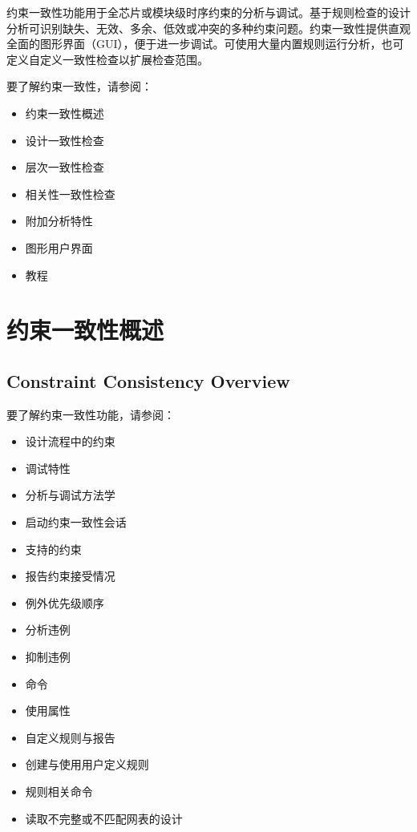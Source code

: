 \label{chap:cc}

约束一致性功能用于全芯片或模块级时序约束的分析与调试。基于规则检查的设计分析可识别缺失、无效、多余、低效或冲突的多种约束问题。约束一致性提供直观全面的图形界面（GUI），便于进一步调试。可使用大量内置规则运行分析，也可定义自定义一致性检查以扩展检查范围。

要了解约束一致性，请参阅：
\begin{itemize}
  \item 约束一致性概述
  \item 设计一致性检查
  \item 层次一致性检查
  \item 相关性一致性检查
  \item 附加分析特性
  \item 图形用户界面
  \item 教程
\end{itemize}

\section{约束一致性概述}
\subsection*{Constraint Consistency Overview}

要了解约束一致性功能，请参阅：
\begin{itemize}
  \item 设计流程中的约束
  \item 调试特性
  \item 分析与调试方法学
  \item 启动约束一致性会话
  \item 支持的约束
  \item 报告约束接受情况
  \item 例外优先级顺序
  \item 分析违例
  \item 抑制违例
  \item {} 命令
  \item 使用属性
  \item 自定义规则与报告
  \item 创建与使用用户定义规则
  \item 规则相关命令
  \item 读取不完整或不匹配网表的设计
\end{itemize}

